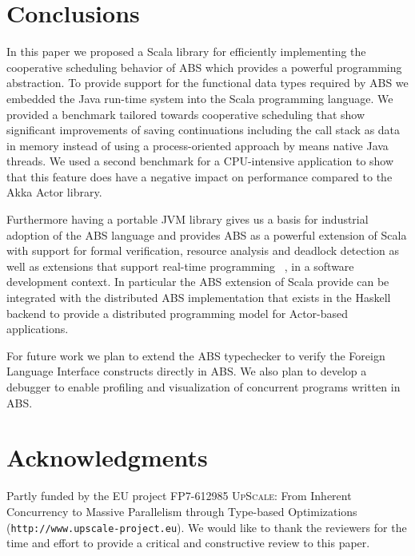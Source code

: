 \section{Conclusions}
\label{conc}
In this paper we proposed a Scala library for efficiently implementing the cooperative scheduling behavior of ABS which provides a powerful programming abstraction. To provide support for the functional data types required by ABS we embedded the Java run-time system into the Scala programming language. We provided a benchmark tailored towards cooperative scheduling that show significant improvements of saving continuations including the call stack as data in memory instead of using a process-oriented approach by means native Java threads. We used a second benchmark for a CPU-intensive application to show that this feature does have a negative impact on performance compared to the Akka Actor library.
\par Furthermore having a portable JVM library gives us a basis for industrial adoption of the ABS language and provides ABS as a powerful extension of Scala with support for formal verification, resource analysis and deadlock detection as well as extensions that support real-time programming ~\cite{rabs}, in a software development context. In particular the ABS extension of Scala provide can be integrated with the distributed ABS implementation that exists in the Haskell backend \cite{cloud} to provide a distributed programming model for Actor-based applications.
\par For future work we plan to extend the ABS typechecker to verify the Foreign Language Interface constructs directly in ABS. We also plan to develop a debugger to enable profiling and visualization of concurrent programs written in ABS. 


\section{Acknowledgments}
Partly funded by the EU project FP7-612985
\textsc{UpScale}: From Inherent Concurrency to Massive Parallelism
through Type-based Optimizations \\ (\texttt{http:/$\!$/www.upscale-project.eu}). We would like to thank the reviewers for the time and effort to provide a critical and constructive review to this paper.
